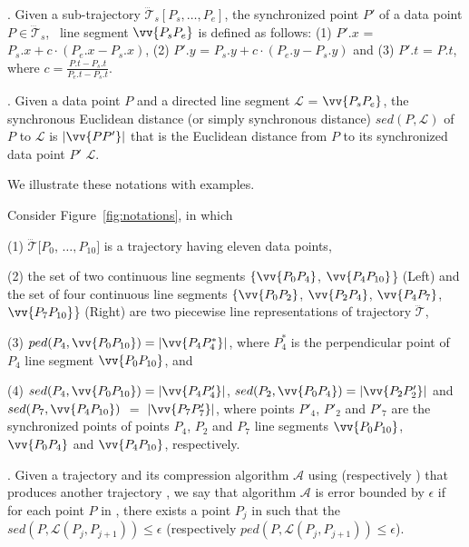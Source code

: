 . Given a sub-trajectory $\dddot{\mathcal{T}}_s[P_s, \ldots, P_e]$, the synchronized point $P'$ of a data point  $P \in \dddot{\mathcal{T}}_s$, ~\wrt line segment $\vv{P_sP_e}$ is defined as follows:
(1) $P'.x$ = $P_s.x +  c\cdot(P_e.x - P_s.x)$,
(2) $P'.y$ = $P_s.y +  c\cdot(P_e.y - P_s.y)$ and
(3) $P'.t$ = $P.t$, where $c= \frac{P.t-P_s.t}{P_e.t-P_s.t}$.


. Given a data point $P$ and a directed line segment $\mathcal{L}$ = $\vv{P_{s}P_{e}}$, the synchronous Euclidean distance (or simply synchronous distance) $sed(P, \mathcal{L})$ of $P$ to $\mathcal{L}$ is $|\vv{PP'}|$ that is the Euclidean distance from $P$ to its synchronized data point $P'$ \wrt $\mathcal{L}$. %


We illustrate these notations with examples.


\begin{example}
\label{exm-notations}
Consider Figure~\ref{fig:notations}, in which

\sstab(1) $\dddot{\mathcal{T}}[P_0$, $\ldots, P_{10}]$ is a trajectory having eleven data points,

\sstab (2) the set of two continuous line segments $\{\vv{P_0P_4}$, $\vv{P_4P_{10}}$\} (Left) and the set of four continuous line segments $\{\vv{P_0P_2}$, $\vv{P_2P_4}$, $\vv{P_4P_7}$, $\vv{P_7P_{10}}$\} (Right) are two piecewise line representations of trajectory $\dddot{\mathcal{T}}$,

\sstab(3) $ped(P_4, \vv{P_0P_{10}})=|\vv{P_4P^*_4}|$, where $P^*_4$ is the perpendicular point of $P_4$ \wrt line segment $\vv{P_0P_{10}}$, and

\sstab (4) $sed(P_4, \vv{P_0P_{10}})= |\vv{P_4P'_4}|$, $sed(P_2, \vv{P_0P_{4}})= |\vv{P_2P'_2}|$ and $sed(P_7, \vv{P_4P_{10}})$ $=$ $|\vv{P_7P'_7}|$,
where points $P'_4$, $P'_2$ and $P'_7$ are the synchronized points of points $P_4$, $P_2$ and $P_7$ \wrt line segments $\vv{P_0P_{10}}$, $\vv{P_0P_{4}}$ and $\vv{P_4P_{10}}$, respectively.
\end{example}

. Given a trajectory  and its compression  algorithm $\mathcal{A}$ using \sed (respectively \ped) that produces another trajectory ,
we say that algorithm $\mathcal{A}$ is error bounded by $\epsilon$ if  for each point $P$ in , there exists a point $P_j$ in  such that the  $sed(P, \mathcal{L}(P_j,P_{j+1}))\le \epsilon$ (respectively $ped(P, \mathcal{L}(P_j,P_{j+1}))\le \epsilon$).



